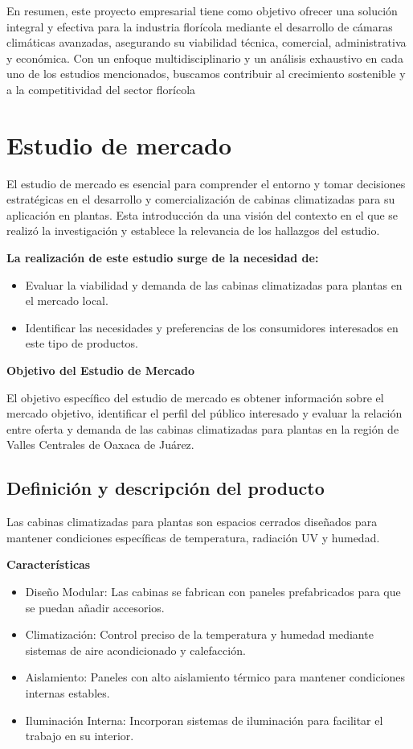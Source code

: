 En resumen, este proyecto empresarial tiene como objetivo ofrecer una solución integral y efectiva para la industria florícola mediante el desarrollo de cámaras climáticas avanzadas, asegurando su viabilidad técnica, comercial, administrativa y económica. Con un enfoque multidisciplinario y un análisis exhaustivo en cada uno de los estudios mencionados, buscamos contribuir al crecimiento sostenible y a la competitividad del sector florícola


\chapter{Estudio de mercado}

El estudio de mercado es esencial para comprender el entorno y tomar decisiones estratégicas en el desarrollo y comercialización de cabinas climatizadas para su aplicación en plantas. Esta introducción da una visión del contexto en el que se realizó la investigación y establece la relevancia de los hallazgos del estudio.

\textbf{La realización de este estudio surge de la necesidad de:}

\begin{itemize}
    \item Evaluar la viabilidad y demanda de las cabinas climatizadas para plantas en el mercado local.
    \item Identificar las necesidades y preferencias de los consumidores interesados en este tipo de productos.
\end{itemize}

\textbf{Objetivo del Estudio de Mercado}

El objetivo específico del estudio de mercado es obtener información sobre el mercado objetivo, identificar el perfil del público interesado y evaluar la relación entre oferta y demanda de las cabinas climatizadas para plantas en la región de Valles Centrales de Oaxaca de Juárez. 

\section{Definición y descripción del producto}

Las cabinas climatizadas para plantas son espacios cerrados diseñados para mantener condiciones específicas de temperatura, radiación UV y humedad. 

\textbf{Características}
\begin{itemize}
    \item Diseño Modular: Las cabinas se fabrican con paneles prefabricados para que se puedan añadir accesorios.
    \item Climatización: Control preciso de la temperatura y humedad mediante sistemas de aire acondicionado y calefacción.
    \item Aislamiento: Paneles con alto aislamiento térmico para mantener condiciones internas estables.
    \item Iluminación Interna: Incorporan sistemas de iluminación para facilitar el trabajo en su interior.
\end{itemize}


